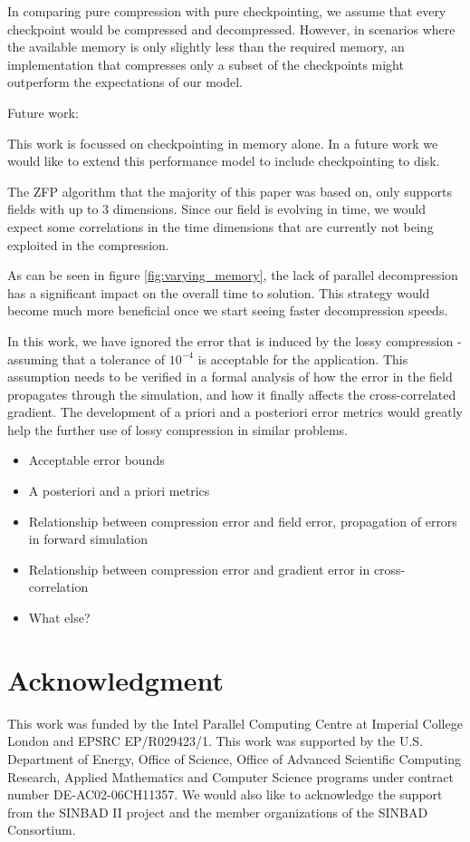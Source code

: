 \documentclass[conference]{IEEEtran}
\begin{document}
In comparing pure compression with pure checkpointing, we assume that every
checkpoint would be compressed and decompressed. However, in scenarios
where the available memory is only slightly less than the required
memory, an implementation that compresses only a subset of the
checkpoints might outperform the expectations of our model. 



Future work:

This work is focussed on checkpointing in memory alone. In a future
work we would like to extend this performance model to include
checkpointing to disk. 

The ZFP algorithm that the majority of this paper was based on, only
supports fields with up to 3 dimensions. Since our field is evolving
in time, we would expect some correlations in the time dimensions that
are currently not being exploited in the compression.

As can be seen in figure \ref{fig:varying_memory}, the lack of
parallel decompression has a significant impact on the overall time to
solution. This strategy would become much more beneficial once we
start seeing faster decompression speeds. 

In this work, we have ignored the error that is induced by the lossy
compression - assuming that a tolerance of $10^{-4}$ is acceptable for
the application. This assumption needs to be verified in a formal
analysis of how the error in the field propagates through the
simulation, and how it finally affects the cross-correlated gradient. 
The development of a priori and a posteriori error metrics would
greatly help the further use of lossy compression in similar
problems. 
\begin{itemize}
\item Acceptable error bounds
\item A posteriori and a priori metrics
\item Relationship between compression error and field error, propagation of errors in forward simulation
\item Relationship between compression error and gradient error in cross-correlation
\item What else?
\end{itemize}

\section*{Acknowledgment}
This work was funded by the Intel Parallel Computing Centre at
Imperial College London and EPSRC EP/R029423/1. 
This work was supported by the U.S. Department of Energy, Office of Science,
Office of Advanced Scientific Computing Research, Applied Mathematics and
Computer Science programs under contract number DE-AC02-06CH11357.
We would also like to acknowledge the support from the SINBAD II project and
the member organizations of the SINBAD Consortium.
\end{document}
